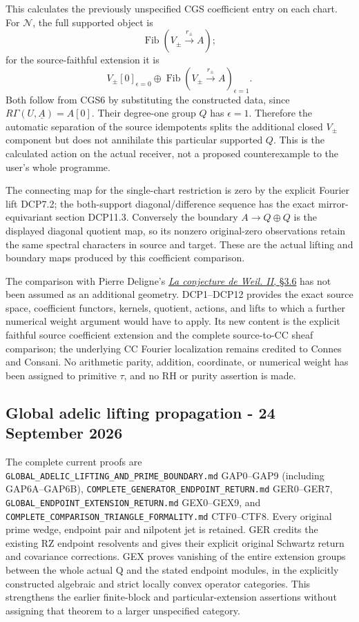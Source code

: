 This calculates the previously unspecified CGS coefficient entry on each
chart. For \(\mathcal N\), the full supported object is \[
 \operatorname{Fib}(V_\pm\xrightarrow{r_\pm}A);
\] for the source-faithful extension it is \[
 V_\pm[0]_{\epsilon=0}\oplus
 \operatorname{Fib}(V_\pm\xrightarrow{r_\pm}A)_{\epsilon=1}.
\tag{DCP12.1}
\] Both follow from CGS6 by substituting the constructed data, since
\(R\Gamma(U,\underline A)=A[0]\). Their degree-one group \(Q\) has
\(\epsilon=1\). Therefore the automatic separation of the source
idempotents splits the additional closed \(V_\pm\) component but does
not annihilate this particular supported \(Q\). This is the calculated
action on the actual receiver, not a proposed counterexample to the
user's whole programme.

The connecting map for the single-chart restriction is zero by the
explicit Fourier lift DCP7.2; the both-support diagonal/difference
sequence has the exact mirror-equivariant section DCP11.3. Conversely
the boundary \(A\to Q\oplus Q\) is the displayed diagonal quotient map,
so its nonzero original-zero observations retain the same spectral
characters in source and target. These are the actual lifting and
boundary maps produced by this coefficient comparison.

The comparison with Pierre Deligne's
\href{https://www.numdam.org/item/PMIHES_1980__52__137_0/}{\emph{La
conjecture de Weil. II}, §3.6} has not been assumed as an additional
geometry. DCP1--DCP12 provides the exact source space, coefficient
functors, kernels, quotient, actions, and lifts to which a further
numerical weight argument would have to apply. Its new content is the
explicit faithful source coefficient extension and the complete
source-to-CC sheaf comparison; the underlying CC Fourier localization
remains credited to Connes and Consani. No arithmetic parity, addition,
coordinate, or numerical weight has been assigned to primitive \(\tau\),
and no RH or purity assertion is made.

\subsection{Global adelic lifting propagation - 24 September
2026}\label{global-adelic-lifting-propagation---24-september-2026-occurrence-3}

The complete current proofs are
\nolinkurl{GLOBAL_ADELIC_LIFTING_AND_PRIME_BOUNDARY.md} GAP0--GAP9 (including
GAP6A--GAP6B), \nolinkurl{COMPLETE_GENERATOR_ENDPOINT_RETURN.md} GER0--GER7,
\nolinkurl{GLOBAL_ENDPOINT_EXTENSION_RETURN.md} GEX0--GEX9, and
\nolinkurl{COMPLETE_COMPARISON_TRIANGLE_FORMALITY.md} CTF0--CTF8. Every original
prime wedge, endpoint pair and nilpotent jet is retained. GER credits
the existing RZ endpoint resolvents and gives their explicit original
Schwartz return and covariance corrections. GEX proves vanishing of the
entire extension groups between the whole actual Q and the stated
endpoint modules, in the explicitly constructed algebraic and strict
locally convex operator categories. This strengthens the earlier
finite-block and particular-extension assertions without assigning that
theorem to a larger unspecified category.

